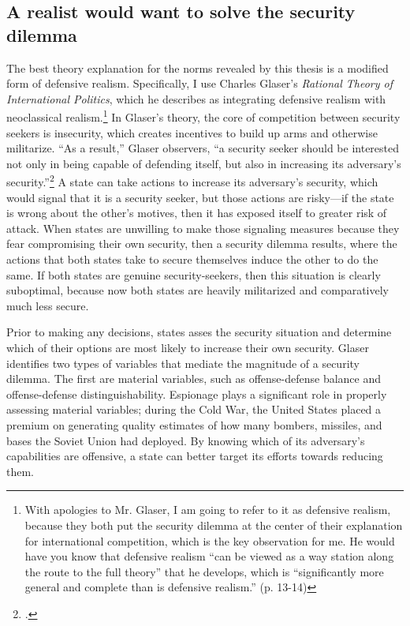 \documentclass{memoir}
\begin{document}
\begin{refsegment}
\subsection{A realist would want to solve the security dilemma}
The best theory explanation for the norms revealed by this thesis is a modified form of defensive realism. Specifically, I use Charles Glaser's \emph{Rational Theory of International Politics}, which he describes as integrating defensive realism with neoclassical realism.\footnote{With apologies to Mr. Glaser, I am going to refer to it as defensive realism, because they both put the security dilemma at the center of their explanation for international competition, which is the key observation for me. He would have you know that defensive realism ``can be viewed as a way station along the route to the full theory'' that he develops, which is ``significantly more general and complete than is defensive realism.'' (p. 13-14)} In Glaser's theory, the core of competition between security seekers is insecurity, which creates incentives to build up arms and otherwise militarize. ``As a result,'' Glaser observers, ``a security seeker should be interested not only in being capable of defending itself, but also in increasing its adversary's security.''\footcite[p.~7]{glaser_rational_2010} A state can take actions to increase its adversary's security, which would signal that it is a security seeker, but those actions are risky---if the state is wrong about the other's motives, then it has exposed itself to greater risk of attack. When states are unwilling to make those signaling measures because they fear compromising their own security, then a security dilemma results, where the actions that both states take to secure themselves induce the other to do the same. If both states are genuine security-seekers, then this situation is clearly suboptimal, because now both states are heavily militarized and comparatively much less secure.

Prior to making any decisions, states asses the security situation and determine which of their options are most likely to increase their own security. Glaser identifies two types of variables that mediate the magnitude of a security dilemma. The first are material variables, such as offense-defense balance and offense-defense distinguishability. Espionage plays a significant role in properly assessing material variables; during the Cold War, the United States placed a premium on generating quality estimates of how many bombers, missiles, and bases the Soviet Union had deployed. By knowing which of its adversary's capabilities are offensive, a state can better target its efforts towards reducing them.


\end{refsegment}
\end{document}
